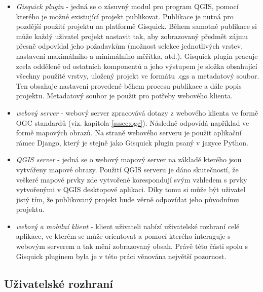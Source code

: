 \begin{itemize}
\item\textit{Gisquick plugin} - jedná se o zásuvný modul pro
program QGIS, pomocí kterého je možné existující projekt
publikovat. Publikace je nutná pro pozdější použití projektu
na platformě Gisquick. Během samotné publikace si může každý
uživatel projekt nastavit tak, aby zobrazovaný předmět zájmu
přesně odpovídal jeho požadavkům (možnost selekce jednotlivých
vrstev, nastavení maximálního a minimálního měřítka,
atd.). Gisquick plugin pracuje zcela odděleně od ostatních
komponentů a jeho výstupem je složka obsahující všechny použité
vrstvy, uložený projekt ve formátu .qgs a metadatový soubor. Ten
obsahuje nastavení provedené během procesu publikace a dále popis
projektu. Metadatový soubor je použit pro potřeby webového klienta.
\item\textit{webový server} - webový server zpracovává
dotazy z webového klienta ve formě OGC standardů (viz. kapitola
\ref{sssec:ogc}). Následně odpovídá například ve formě mapových
obrazů. Na straně webového serveru je použit aplikační rámec Django,
který je stejně jako Gisquick plugin psaný v jazyce Python.
\item\textit{QGIS server} - jedná se o webový mapový server
na základě kterého jsou vytvářeny mapové obrazy. Použití
QGIS serveru je dáno skutečností, že veškeré mapové prvky
zde vytvořené korespondují svým vzhledem s prvky vytvořenými
v QGIS desktopové aplikaci. Díky tomu si může být uživatel
jistý tím, že publikovaný projekt bude věrně odpovídat jeho
původnímu projektu.
\item\textit{webový a mobilní klient} - klient uživateli nabízí
uživatelské rozhraní celé aplikace, ve kterém se může
orientovat a pomocí kterého interaguje s webovým serverem a tak
mění zobrazovaný obsah. Právě této části spolu s Gisquick
pluginem byla je v této práci věnována největší pozornost.
\end{itemize}

\subsection{Uživatelské rozhraní}


